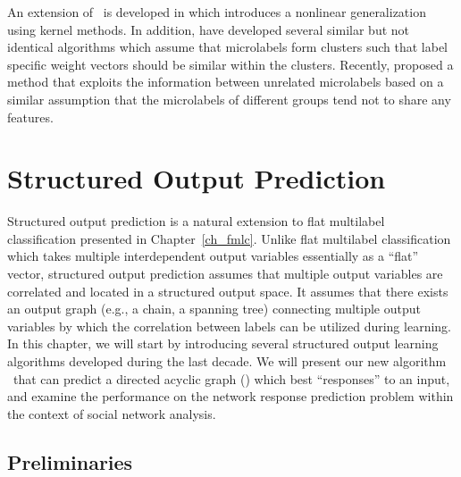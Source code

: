 {An extension of \mtl\ is developed in \citep{Argyriou08convex} which introduces a nonlinear generalization using kernel methods.
In addition, \citet{Argyriou08an,Jacob09cluster} have developed several similar but not identical algorithms which assume that microlabels form clusters such that label specific weight vectors should be similar within the clusters.
Recently, \citet{Paredes12exploit} proposed a method that exploits the information between unrelated microlabels based on a similar assumption that the microlabels of different groups tend not to share any features.




%
%
\chapter{Structured Output Prediction} \label{ch_sop}

Structured output prediction is a natural extension to flat multilabel classification presented in Chapter~\ref{ch_fmlc}.
Unlike flat multilabel classification which takes multiple interdependent output variables essentially as a ``flat'' vector, structured output prediction assumes that multiple output variables are correlated and located in a structured output space.
It assumes that there exists an output graph (e.g., a chain, a spanning tree) connecting multiple output variables by which the correlation between labels can be utilized during learning.
In this chapter, we will start by introducing several structured output learning algorithms developed during the last decade.
We will present our new algorithm \spin\ that can predict a directed acyclic graph (\daggraph) which best ``responses'' to an input, and examine the performance on the network response prediction problem within the context of social network analysis.



%
%
\section{Preliminaries}

}
